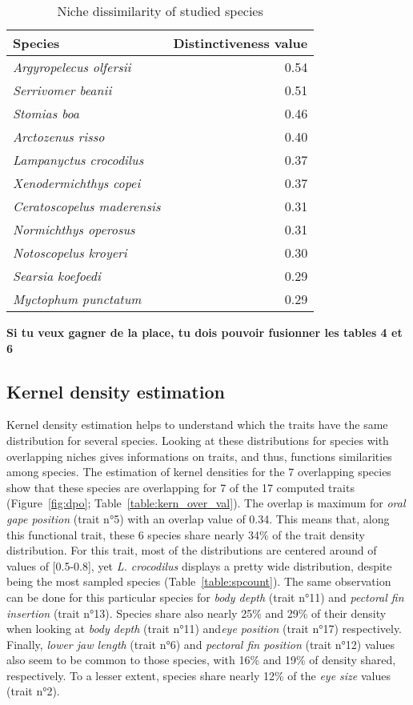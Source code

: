 \begin{table}[!htbp]
\centering
\caption[Dissimilarity values of species' niches]{Niche dissimilarity of studied species}
\label{table:nich_diss}
\begin{adjustbox}{max width=1.1\textwidth,center}
\begin{tabular}{lr}
  \toprule
Species & Distinctiveness value \\ 
  \midrule
  \emph{Argyropelecus olfersii} & 0.54 \\ 
  \emph{Serrivomer beanii} & 0.51 \\ 
  \emph{Stomias boa} & 0.46 \\ 
  \emph{Arctozenus risso} & 0.40 \\ 
  \emph{Lampanyctus crocodilus} & 0.37 \\ 
  \emph{Xenodermichthys copei} & 0.37 \\ 
  \emph{Ceratoscopelus maderensis} & 0.31 \\ 
  \emph{Normichthys operosus} & 0.31 \\ 
  \emph{Notoscopelus kroyeri} & 0.30 \\ 
  \emph{Searsia koefoedi} & 0.29 \\ 
  \emph{Myctophum punctatum} & 0.29 \\  
   \bottomrule
\end{tabular}
\end{adjustbox}
\end{table}

\textbf{Si tu veux gagner de la place, tu dois pouvoir fusionner les tables 4 et 6}


\subsection{Kernel density estimation}
Kernel density estimation helps to understand which the traits have the same distribution for several species. Looking at these distributions for species with overlapping niches gives informations on traits, and thus, functions similarities among species. The estimation of kernel densities for the 7 overlapping species show that these species are overlapping for 7 of the 17 computed traits (Figure~\ref{fig:dpo}; Table~\ref{table:kern_over_val}). The overlap is maximum for \emph{oral gape position} (trait n°5) with an overlap value of 0.34. This means that, along this functional trait, these 6 species share nearly 34\% of the trait density distribution. For this trait, most of the distributions are centered around of values of [0.5-0.8], yet \textit{L. crocodilus} displays a pretty wide distribution, despite being the most sampled species (Table~\ref{table:spcount}). The same observation can be done for this particular species for \emph{body depth} (trait n°11) and \emph{pectoral fin insertion} (trait n°13). Species share also nearly 25\% and 29\% of their density when looking at \emph{body depth} (trait n°11) and\emph{eye position} (trait n°17) respectively. Finally, \emph{lower jaw length} (trait n°6) and \emph{pectoral fin position} (trait n°12) values also seem to be common to those species, with 16\% and 19\% of density shared, respectively. To a lesser extent, species share nearly 12\% of the \emph{eye size} values (trait n°2).

